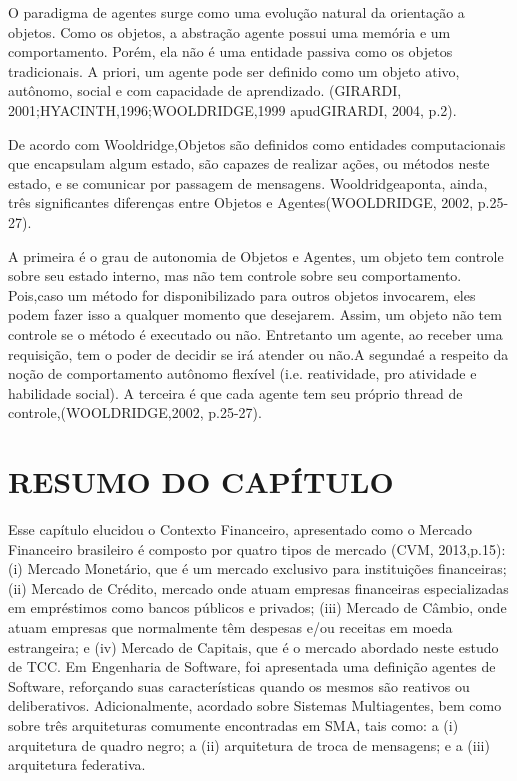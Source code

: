O paradigma de agentes surge como uma evolução natural da orientação a objetos. Como os objetos, a abstração agente possui uma memória e um comportamento. Porém, ela não é uma entidade passiva como os objetos tradicionais. A priori, um agente pode ser definido como um objeto ativo, autônomo, social e com capacidade de aprendizado. 
(GIRARDI, 2001;HYACINTH,1996;WOOLDRIDGE,1999 apudGIRARDI, 2004, p.2).

De acordo com Wooldridge,Objetos são definidos como entidades computacionais que encapsulam algum estado, são capazes de realizar ações, ou métodos neste estado, e se comunicar por passagem de mensagens. Wooldridgeaponta, ainda, três significantes diferenças entre Objetos e Agentes(WOOLDRIDGE, 2002, p.25-27). 

A primeira é o grau de autonomia de Objetos e Agentes, um objeto tem controle sobre seu estado interno, mas não tem controle sobre seu comportamento. Pois,caso um método for disponibilizado para outros objetos invocarem, eles podem fazer isso a qualquer momento que desejarem. Assim, um objeto não tem controle se o método é executado ou não. Entretanto um agente, ao receber uma requisição, tem o poder de decidir se irá atender ou não.A segundaé a respeito da noção de comportamento autônomo flexível (i.e. reatividade, pro atividade e habilidade social). A terceira é que cada agente tem seu próprio thread de controle,(WOOLDRIDGE,2002, p.25-27).


\section{RESUMO DO CAPÍTULO}

Esse capítulo elucidou o Contexto Financeiro, apresentado como o Mercado Financeiro brasileiro é composto por quatro tipos de mercado (CVM, 2013,p.15): (i) Mercado Monetário, que é um mercado exclusivo para instituições financeiras; (ii) Mercado de Crédito, mercado onde atuam empresas financeiras especializadas em empréstimos como bancos públicos e privados; (iii) Mercado de Câmbio, onde atuam empresas que normalmente têm despesas e/ou receitas em moeda estrangeira; e (iv) Mercado de Capitais, que é o mercado abordado neste estudo de TCC. Em Engenharia de Software, foi apresentada uma definição agentes de Software, reforçando suas características quando os mesmos são reativos ou deliberativos. Adicionalmente, acordado sobre Sistemas Multiagentes, bem como sobre três arquiteturas comumente encontradas em SMA, tais como: a (i) arquitetura de quadro negro; a (ii) arquitetura de troca de mensagens; e a (iii) arquitetura federativa.
\newpage
